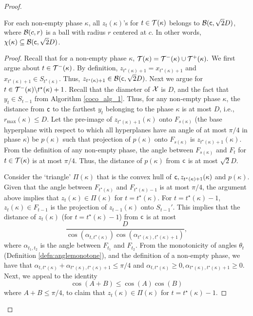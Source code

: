 \begin{proof}
\begin{lemma}\label{lem:membership} For each non-empty phase $\kappa$, all $z_{t}(\kappa)$'s for $t\in \mathcal{T}(\kappa)$ belongs to $\mathcal{B}({\mathsf{c}}, \sqrt{2}D)$, where $\mathcal{B}(c,r)$ is a ball with radius $r$ centered at $c$. In other words, $\chi(\kappa) \subseteq \mathcal{B}({\mathsf{c}}, \sqrt{2}D)$.
\end{lemma}
\begin{proof}
Recall that for a non-empty phase $\kappa$,  $\mathcal{T}(\kappa) = \mathcal{T}^-(\kappa) \cup  \mathcal{T}^+(\kappa).$ We first argue about $t\in \mathcal{T}^-(\kappa)$.
By definition, $z_{t^\star(\kappa)+1} = x_{t^\star(\kappa)+1}$ and $x_{t^\star(\kappa)+1}\in S_{t^\star(\kappa)}$. Thus, $z_{t^\star(\kappa)+1} \in \mathcal{B}({\mathsf{c}}, \sqrt{2}D)$.
Next we argue for $t \in \mathcal{T}^-(\kappa) \backslash t^\star(\kappa)+1$.
Recall that the diameter of $\mathcal{X}$ is $D$, and the fact that $y_t \in S_{t-1}$ from Algorithm \ref{coco_alg_1}. Thus, for any non-empty phase $\kappa$, the distance from ${\mathsf{c}}$ to the farthest $y_t$ belonging to the phase $\kappa$ is at most $D$, i.e., $r_{\max}(\kappa)\le D$. 
Let the pre-image of $z_{t^\star(\kappa)+1}(\kappa)$ onto $F_{s(\kappa)}$ (the base hyperplane with respect to which all hyperplanes have an angle of at most $\pi/4$ in phase $\kappa$) be $p(\kappa)$ such that projection of $p(\kappa)$ onto $F_{s(\kappa)}$ is $z_{t^\star(\kappa)+1}(\kappa)$. 
From the definition of any non-empty phase, the angle between $F_{s(\kappa)}$ and $F_{t}$ for $t\in \mathcal{T}(\kappa)$ is at most $\pi/4$. 
Thus, the distance of $p(\kappa)$ from ${\mathsf{c}}$ is at most $\sqrt{2}D$. 




Consider the `triangle' $\Pi(\kappa)$ that is the convex hull of ${\mathsf{c}}, z_{t^\star(\kappa)+1}(\kappa)$ and $p(\kappa)$.
Given that the angle between $F_{t^\star(\kappa)}$ and $F_{t^\star(\kappa)-1}$ is at most $\pi/4$, the argument above implies that 
$z_t(\kappa) \in \Pi(\kappa)$ for $t=t^\star(\kappa)$. For $t= t^\star(\kappa)-1$, $z_t(\kappa) \in F_{t-1}$ is the projection of  $z_{t-1}(\kappa)$ onto $S_{t-1}'$. This implies that the distance of $z_t(\kappa)$ (for $t=t^\star(\kappa)-1$) from ${\mathsf{c}}$ is at most 
$$\frac{D}{\cos(\alpha_{t, t^\star(\kappa)}) \cos(\alpha_{t^\star(\kappa), t^\star(\kappa)+1})},$$ where 
$\alpha_{t_1,t_2}$ is the angle between $F_{t_1}$ and $F_{t_2}$.
From the monotonicity of angles $\theta_t$ (Definition \ref{defn:anglemonotone}), and the definition of a non-empty phase, we have that $\alpha_{t, t^\star(\kappa)}+\alpha_{t^\star(\kappa), t^\star(\kappa)+1} \le \pi/4$ and $\alpha_{t, t^\star(\kappa)}\ge 0, \alpha_{t^\star(\kappa), t^\star(\kappa)+1}\ge 0$.
Next, we appeal to the identity
\begin{equation}\label{eq:cosidentity}
\cos(A+B) \le \cos(A)\cos(B)
\end{equation} where $A+B\le \pi/4$, to claim that $z_t(\kappa) \in \Pi(\kappa)$ for $t=t^\star(\kappa)-1$. 


\end{proof}
\end{proof}

